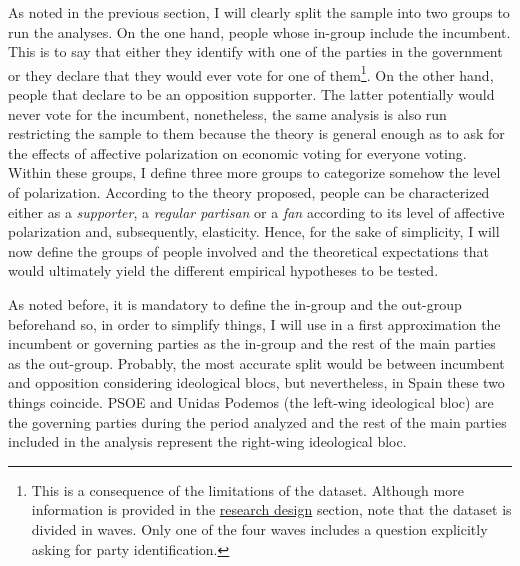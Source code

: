 \documentclass[a4paper, svgnames]{article}
\begin{document}
As noted in the previous section, I will clearly split the sample into two groups to run the analyses. On the one hand, people whose in-group include the incumbent. This is to say that either they identify with one of the parties in the government or they declare that they would ever vote for one of them\footnote{This is a consequence of the limitations of the dataset. Although more information is provided in the \hyperref[section:research_design]{research design} section, note that the dataset is divided in waves. Only one of the four waves includes a question explicitly asking for party identification.}. On the other hand, people that declare to be an opposition supporter. The latter potentially would never vote for the incumbent, nonetheless, the same analysis is also run restricting the sample to them because the theory is general enough as to ask for the effects of affective polarization on economic voting for everyone voting. Within these groups, I define three more groups to categorize somehow the level of polarization. According to the theory proposed, people can be characterized either as a \textit{supporter}, a \textit{regular partisan} or a \textit{fan} according to its level of affective polarization and, subsequently, elasticity. Hence, for the sake of simplicity, I will now define the groups of people involved and the theoretical expectations that would ultimately yield the different empirical hypotheses to be tested.


As noted before, it is mandatory to define the in-group and the out-group beforehand so, in order to simplify things, I will use in a first approximation the incumbent or governing parties as the in-group and the rest of the main parties as the out-group. Probably, the most accurate split would be between incumbent and opposition considering ideological blocs, but nevertheless, in Spain these two things coincide. PSOE and Unidas Podemos (the left-wing ideological bloc) are the governing parties during the period analyzed and the rest of the main parties included in the analysis represent the right-wing ideological bloc.
\end{document}
